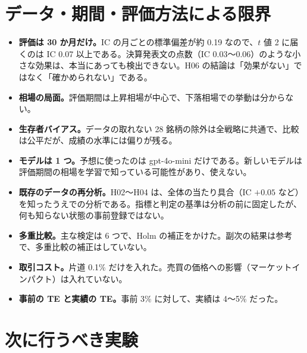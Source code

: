 \documentclass[xelatex,ja=standard,jafont=haranoaji,a4paper,10pt,openany]{bxjsreport}
\begin{document}
\chapter{データ・期間・評価方法による限界}\label{ch:limits}

\begin{itemize}
\item \textbf{評価は 30 か月だけ。}IC の月ごとの標準偏差が約 0.19 なので、$t$ 値 2 に届くのは IC 0.07 以上である。決算発表文の点数（IC 0.03〜0.06）のような小さな効果は、本当にあっても検出できない。H06 の結論は「効果がない」ではなく「確かめられない」である。
\item \textbf{相場の局面。}評価期間は上昇相場が中心で、下落相場での挙動は分からない。
\item \textbf{生存者バイアス。}データの取れない 28 銘柄の除外は全戦略に共通で、比較は公平だが、成績の水準には偏りが残る。
\item \textbf{モデルは 1 つ。}予想に使ったのは gpt-4o-mini だけである。新しいモデルは評価期間の相場を学習で知っている可能性があり、使えない。
\item \textbf{既存のデータの再分析。}H02〜H04 は、全体の当たり具合（IC $+0.05$ など）を知ったうえでの分析である。指標と判定の基準は分析の前に固定したが、何も知らない状態の事前登録ではない。
\item \textbf{多重比較。}主な検定は 6 つで、Holm の補正をかけた。副次の結果は参考で、多重比較の補正はしていない。
\item \textbf{取引コスト。}片道 0.1\% だけを入れた。売買の価格への影響（マーケットインパクト）は入れていない。
\item \textbf{事前の TE と実績の TE。}事前 3\% に対して、実績は 4〜5\% だった。
\end{itemize}

\chapter{次に行うべき実験}\label{ch:next}
\end{document}
